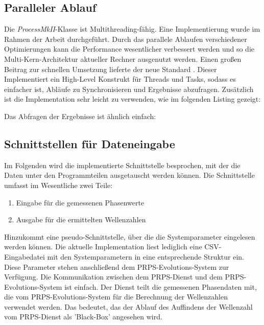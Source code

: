 %
%

%
%
\subsection{Paralleler Ablauf}
\label{parallel_computing}
%
Die \textit{ProcessMkII}-Klasse ist Multithreading-fähig. Eine Implementierung wurde im Rahmen der Arbeit durchgeführt. Durch das parallele Ablaufen verschiedener Optimierungen kann die Performance wesentlicher verbessert werden und so die Multi-Kern-Architektur aktueller Rechner ausgenutzt werden. Einen großen Beitrag zur schnellen Umsetzung lieferte der neue Standard . Dieser Implementiert ein High-Level Konstrukt für Threads und Tasks, sodass es einfacher ist, Abläufe zu Synchronisieren und Ergebnisse abzufragen. Zusätzlich ist die Implementation sehr leicht zu verwenden, wie im folgenden Listing gezeigt:
%

				 \label{lst:Parallel_example1.cpp}
%
\vspace{2mm}
Das Abfragen der Ergebnisse ist ähnlich einfach:
\vspace{2mm}
%

				 \label{lst:Parallel_example2.cpp}
%
\vspace{2mm}
%
\subsection{Schnittstellen für Dateneingabe}
%
Im Folgenden wird die implementierte Schnittstelle besprochen, mit der die Daten unter den Programmteilen ausgetauscht werden können. Die Schnittstelle umfasst im Wesentliche zwei Teile:
\begin{enumerate}
	\item Eingabe für die gemessenen Phasenwerte
	\item Ausgabe für die ermittelten Wellenzahlen
\end{enumerate}
%
Hinzukommt eine pseudo-Schnittstelle, über die die Systemparameter eingelesen werden können. Die aktuelle Implementation liest lediglich eine CSV-Eingabedatei mit den Systemparametern in eine entsprechende Struktur ein. Diese Parameter stehen anschließend dem PRPS-Evolutions-System zur Verfügung.
%
Die Kommunikation zwischen dem PRPS-Dienst und dem PRPS-Evolutions-System ist einfach. Der Dienst teilt die gemessenen Phasendaten mit, die vom PRPS-Evolutions-System für die Berechnung der Wellenzahlen verwendet werden. Das bedeutet, das der Ablauf des Auffindens der Wellenzahl vom PRPS-Dienst als 'Black-Box' angesehen wird.\\
%
